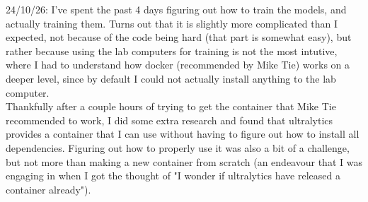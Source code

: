\documentclass[12pt]{article}
\begin{document}
24/10/26: I've spent the past 4 days figuring out how to train the models, and actually training them. Turns out that it is slightly more complicated than I expected, not because of the code being hard (that part is somewhat easy), but rather because using the lab computers for training is not the most intutive, where I had to understand how docker (recommended by Mike Tie) works on a deeper level, since by default I could not actually install anything to the lab computer. \\
Thankfully after a couple hours of trying to get the container that Mike Tie recommended to work, I did some extra research and found that ultralytics provides a container that I can use without having to figure out how to install all dependencies. Figuring out how to properly use it was also a bit of a challenge, but not more than making a new container from scratch (an endeavour that I was engaging in when I got the thought of "I wonder if ultralytics have released a container already").
\end{document}
